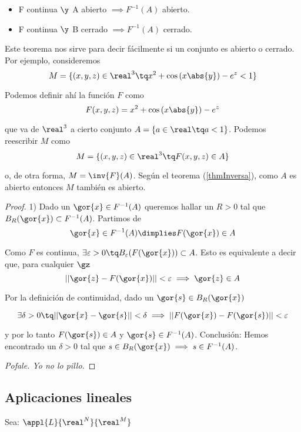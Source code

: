 \documentclass{apuntes}
\begin{document}
\begin{theorem}\par\noindent\par
\label{thmInversa}
\begin{itemize}
\item F continua $\y$ A abierto $\implies F^{-1} (A)$ abierto.
\item F continua $\y$ B cerrado $\implies F^{-1} (A)$ cerrado.
\end{itemize}
\end{theorem}

Este teorema nos sirve para decir fácilmente si un conjunto es abierto o cerrado. Por ejemplo, consideremos
 \[ M=\{(x,y,z) \in \real^3 \tq x^2 + \cos\left(x\abs{y}\right) - e^z < 1 \} \]

Podemos definir ahí la función $F$ como 
\[ F(x,y,z) = x^2 + \cos\left(x\abs{y}\right) - e^z\]

que va de $\real^3$ a cierto conjunto $A = \{ a \in \real \tq a < 1 \}$. Podemos reescribir $M$ como
\[M=\{(x,y,z) \in \real^3 \tq  F(x,y,z) \in A\}\]

o, de otra forma, $M = \inv{F}(A)$. Según el teorema (\ref{thmInversa}), como $A$ es abierto entonces $M$ también es abierto.

\begin{proof}
1) Dado un $\gor{x} \in F^{-1} (A)$ queremos hallar un $R>0$ tal que $B_R(\gor{x})\subset F^{-1} (A)$. Partimos de 
\[\gor{x}\in F^{-1} (A) \dimplies F(\gor{x})\in A\]

Como $F$ es continua, $\exists \varepsilon>0 \tq B_{\varepsilon}(F(\gor{x}))\subset A$. Esto es equivalente a decir que, para cualquier $\gz$
\[ ||\gor{z}-F(\gor{x})|| < \varepsilon \implies \gor{z}\in A\]

Por la definición de continuidad, dado un $\gor{s}\in B_R(\gor{x})$ 

\[ \exists \delta > 0 \tq ||\gor{x}-\gor{s}||<\delta \implies ||F(\gor{x})-F(\gor{s})||< \varepsilon \]

y por lo tanto $F(\gor{s}) \in A$ y $\gor{s} \in F^{-1} (A)$.
Conclusión: Hemos encontrado un $\delta > 0$ tal que $s \in B_R(\gor{x}) \implies s \in F^{-1} (A)$.

\textit{Pofale. Yo no lo pillo.}
\end{proof}



\subsection{Aplicaciones lineales}
Sea: $\appl{L}{\real^N}{\real^M}$
\end{document}
